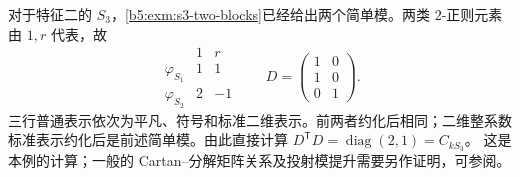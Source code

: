 对于特征二的 \(S_3\)，\cref{b5:exm:s3-two-blocks}已经给出两个简单模。两类 \(2\)-正则元素由 \(1,r\) 代表，故
\[
	\begin{array}{c|rr}
		&1&r\\ \hline \varphi_{S_1}&1&1\\
		\varphi_{S_2}&2&-1
	\end{array}
	\qquad D=
	\begin{pmatrix}
		1&0\\1&0\\0&1
	\end{pmatrix}.
\]
三行普通表示依次为平凡、符号和标准二维表示。前两者约化后相同；二维整系数标准表示约化后是前述简单模。由此直接计算 \(D^{\mathsf T}D=\operatorname{diag}(2,1)=C_{kS_3}\)。 这是本例的计算；一般的 Cartan--分解矩阵关系及投射模提升需要另作证明，可参阅\cite[Section 9.5, Corollary 9.5.6]{Webb2016FiniteGroupRepresentations}。
